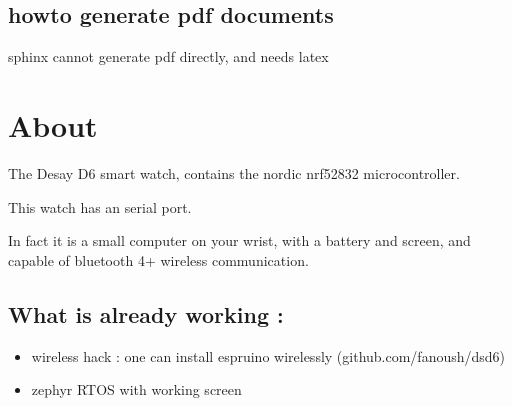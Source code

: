 \documentclass[letterpaper,10pt,english]{sphinxmanual}
\begin{document}
\section{howto generate pdf documents}
\label{\detokenize{hacking/latexpdf:howto-generate-pdf-documents}}\label{\detokenize{hacking/latexpdf::doc}}
sphinx cannot generate pdf directly, and needs latex

\begin{sphinxVerbatim}[commandchars=\\\{\}]
  
  
  
  
  
  
\end{sphinxVerbatim}


\chapter{About}
\label{\detokenize{about:about}}\label{\detokenize{about::doc}}
The Desay D6 smart watch, contains the nordic nrf52832 microcontroller.

This watch has an serial port.

In fact it is a small computer on your wrist, with a battery and screen, and capable of bluetooth 4+ wireless communication.

\begin{sphinxVerbatim}[commandchars=\\\{\}]
        
           
\end{sphinxVerbatim}


\section{What is already working :}
\label{\detokenize{about:what-is-already-working}}\begin{itemize}
\item {} 
wireless hack : one can install espruino wirelessly (github.com/fanoush/ds\sphinxhyphen{}d6)

\item {} 
zephyr RTOS with working screen

\end{itemize}



\renewcommand{\indexname}{Index}
\printindex
\end{document}
